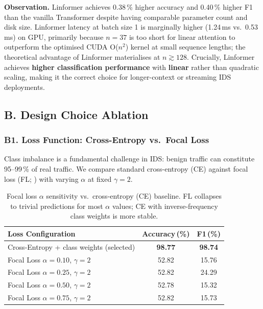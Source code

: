 \textbf{Observation.}
Linformer achieves 0.38\,\% higher accuracy and 0.40\,\% higher F1 than the
vanilla Transformer despite having comparable parameter count and disk size.
Linformer latency at batch size 1 is marginally higher (1.24\,ms vs.\ 0.53\,ms)
on GPU, primarily because $n=37$ is too short for linear attention to
outperform the optimised CUDA O($n^2$) kernel at small sequence lengths;
the theoretical advantage of Linformer materialises at $n \gtrsim 128$.
Crucially, Linformer achieves \textbf{higher classification performance}
with \textbf{linear} rather than quadratic scaling, making it the correct
choice for longer-context or streaming IDS deployments.

\subsection{B. Design Choice Ablation}
\label{sec:design_ablation}

\subsubsection{B1. Loss Function: Cross-Entropy vs.\ Focal Loss}

Class imbalance is a fundamental challenge in IDS: benign traffic can
constitute 95--99\,\% of real traffic.
We compare standard cross-entropy (CE) against focal loss
(FL; \citealt{lin2017focal}) with varying $\alpha$ at fixed $\gamma=2$.

\begin{table}[h]
\centering
\caption{Focal loss $\alpha$ sensitivity vs.\ cross-entropy (CE) baseline.
FL collapses to trivial predictions for most $\alpha$ values; CE with
inverse-frequency class weights is more stable.}
\label{tab:focal_loss}
\begin{tabular}{lcc}
\toprule
\textbf{Loss Configuration} & \textbf{Accuracy\,(\%)} & \textbf{F1\,(\%)} \\
\midrule
Cross-Entropy + class weights (selected) & \textbf{98.77} & \textbf{98.74} \\
Focal Loss $\alpha=0.10$, $\gamma=2$    & 52.82 & 15.76 \\
Focal Loss $\alpha=0.25$, $\gamma=2$    & 52.82 & 24.29 \\
Focal Loss $\alpha=0.50$, $\gamma=2$    & 52.78 & 15.32 \\
Focal Loss $\alpha=0.75$, $\gamma=2$    & 52.82 & 15.73 \\
\bottomrule
\end{tabular}
\end{table}

